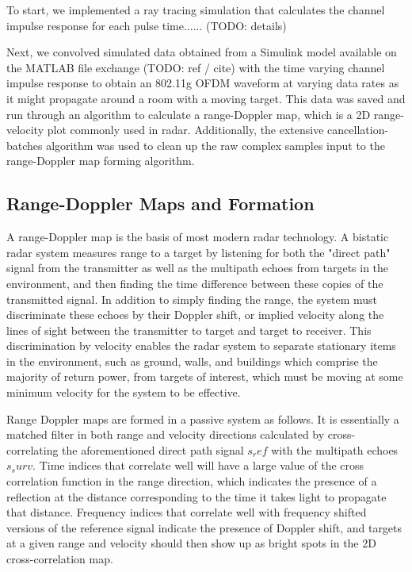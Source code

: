 \documentclass[article,11pt,onecolumn,final]{IEEEtran}
\begin{document}
To start, we implemented a ray tracing simulation that calculates the channel impulse response for each pulse time...... (TODO: details)

Next, we convolved simulated data obtained from a Simulink model available on the MATLAB file exchange (TODO: ref / cite) with the time varying channel impulse response to obtain an 802.11g OFDM waveform at varying data rates as it might propagate around a room with a moving target. This data was saved and run through an algorithm to calculate a range-Doppler map, which is a 2D range-velocity plot commonly used in radar. Additionally, the extensive cancellation-batches algorithm was used to clean up the raw complex samples input to the range-Doppler map forming algorithm.

\subsection{Range-Doppler Maps and Formation}

A range-Doppler map is the basis of most modern radar technology. A bistatic radar system measures range to a target by listening for both the "direct path" signal from the transmitter as well as the multipath echoes from targets in the environment, and then finding the time difference between these copies of the transmitted signal. In addition to simply finding the range, the system must discriminate these echoes by their Doppler shift, or implied velocity along the lines of sight between the transmitter to target and target to receiver. This discrimination by velocity enables the radar system to separate stationary items in the environment, such as ground, walls, and buildings which comprise the majority of return power, from targets of interest, which must be moving at some minimum velocity for the system to be effective.

Range Doppler maps are formed in a passive system as follows. It is essentially a matched filter in both range and velocity directions calculated by cross-correlating the aforementioned direct path signal $s_ref$ with the multipath echoes $s_surv$. Time indices that correlate well will have a large value of the cross correlation function in the range direction, which indicates the presence of a reflection at the distance corresponding to the time it takes light to propagate that distance. Frequency indices that correlate well with frequency shifted versions of the reference signal indicate the presence of Doppler shift, and targets at a given range and velocity should then show up as bright spots in the 2D cross-correlation map.
\end{document}
